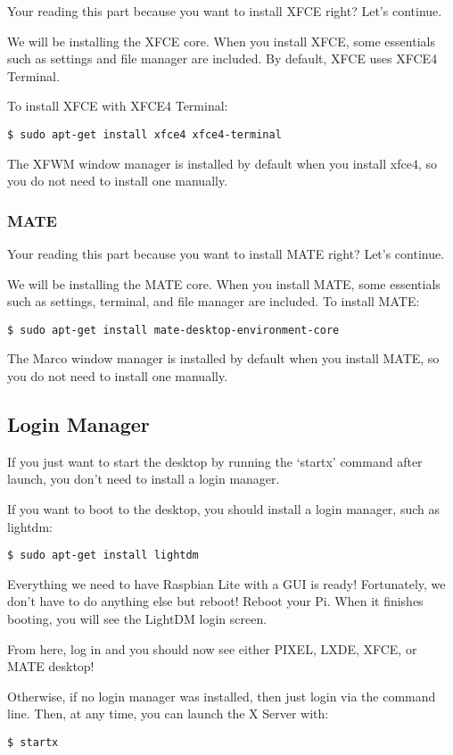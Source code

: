 			Your reading this part because you want to install XFCE right? Let's continue.
			
			We will be installing the XFCE core. When you install XFCE, some essentials such as settings and file manager are included. By default, XFCE uses XFCE4 Terminal.
			
			To install XFCE with XFCE4 Terminal:
\begin{lstlisting}[breaklines=true]
$ sudo apt-get install xfce4 xfce4-terminal
\end{lstlisting}

			The XFWM window manager is installed by default when you install xfce4, so you do not need to install one manually.
			
		\subsubsection*{MATE}
		
			Your reading this part because you want to install MATE right? Let's continue.
			
			We will be installing the MATE core. When you install MATE, some essentials such as settings, terminal, and file manager are included. To install MATE:
\begin{lstlisting}[breaklines=true]
$ sudo apt-get install mate-desktop-environment-core
\end{lstlisting}		

			The Marco window manager is installed by default when you install MATE, so you do not need to install one manually.
			
	\subsection{Login Manager}
	
		If you just want to start the desktop by running the `startx' command after launch, you don't need to install a login manager.
		
		If you want to boot to the desktop, you should install a login manager, such as lightdm:
		
\begin{lstlisting}[breaklines=true]
$ sudo apt-get install lightdm
\end{lstlisting}

		Everything we need to have Raspbian Lite with a GUI is ready! Fortunately, we don't have to do anything else but reboot! Reboot your Pi. When it finishes booting, you will see the LightDM login screen.
		
		From here, log in and you should now see either PIXEL, LXDE, XFCE, or MATE desktop!
 
		 Otherwise, if no login manager was installed, then just login via the command line. Then, at any time, you can launch the X Server with:
\begin{lstlisting}[breaklines=true]
$ startx
\end{lstlisting}
